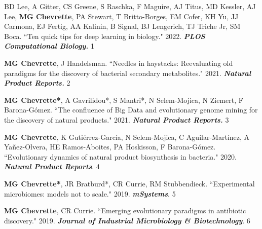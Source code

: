 \begin{cvpubs}


\cvpub
{BD Lee, A Gitter, CS Greene, S Raschka, F Maguire, AJ Titus, MD Kessler, AJ Lee, \textbf{MG Chevrette}, PA Stewart, T Britto-Borges, EM Cofer, KH Yu, JJ Carmona, EJ Fertig, AA Kalinin, B Signal, BJ Lengerich, TJ Triche Jr, SM Boca. ``Ten quick tips for deep learning in biology." 2022. \textbf{\textit{PLOS Computational Biology.}} \textit{\textbf{}}}
{1}

\end{cvpubs} \begin{cvpubs}

\cvpub
{\textbf{MG Chevrette}, J Handelsman. ``Needles in haystacks: Reevaluating old paradigms for the discovery of bacterial secondary metabolites." 2021. \textit{\textbf{Natural Product Reports.}} \textbf{\textit{}}}
{2}

\cvpub
{\textbf{MG Chevrette*}, A Gavrilidou*, S Mantri*, N Selem-Mojica, N Ziemert, F Barona-G\'{o}mez. ``The confluence of Big Data and evolutionary genome mining for the discovery of natural products." 2021. \textit{\textbf{Natural Product Reports.}} \textbf{\textit{}}}
{3}

\cvpub
{\textbf{MG Chevrette}, K Guti\'{e}rrez-Garc\'{i}a, N Selem-Mojica, C Aguilar-Mart\'{i}nez, A Ya\~{n}ez-Olvera, HE Ramos-Aboites, PA Hoskisson, F Barona-G\'{o}mez. ``Evolutionary dynamics of natural product biosynthesis in bacteria." 2020. \textit{\textbf{Natural Product Reports}}. \textbf{\textit{}}}
{4}

\cvpub
{\textbf{MG Chevrette*}, JR Bratburd*, CR Currie, RM Stubbendieck. ``Experimental microbiomes: models not to scale." 2019. \textit{\textbf{mSystems}}. \textbf{\textit{}}}
{5}

\cvpub
{\textbf{MG Chevrette}, CR Currie. ``Emerging evolutionary paradigms in antibiotic discovery." 2019. \textit{\textbf{Journal of Industrial Microbiology \& Biotechnology}}. \textbf{\textit{}}}
{6}


\end{cvpubs}
